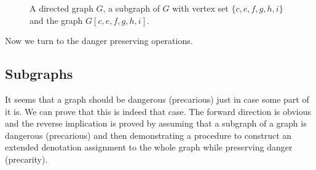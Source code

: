 \documentclass[12pt]{article}
\theoremstyle{remark}
\begin{document}
\begin{figure}[ht]
\caption{A directed graph $G$, a subgraph of $G$ with vertex set $\{c, e, f, g, h, i\}$ and the graph $G[c, e, f, g, h, i]$.}
\end{figure}

Now we turn to the danger preserving operations.

\subsection{Subgraphs}

It seems that a graph should be dangerous (precarious) just in case some part of it is. We can prove that this is indeed that case. The forward direction is obvious and the reverse implication is proved by assuming that a subgraph of a graph is dangerous (precarious) and then demonstrating a procedure to construct an extended denotation assignment to the whole graph while preserving danger (precarity).
\end{document}
